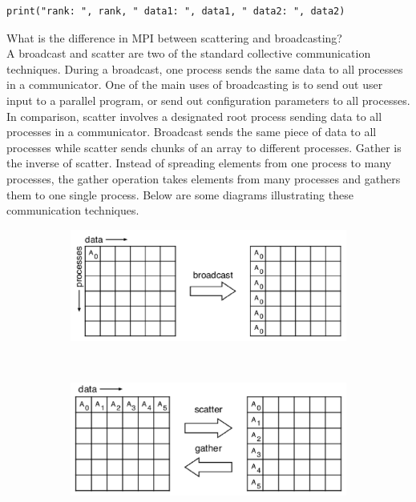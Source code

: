\documentclass[11pt]{article}
\begin{document}
\begin{enumerate}
\begin{verbatim}
print("rank: ", rank, " data1: ", data1, " data2: ", data2) 
    \end{verbatim}
    What is the difference in MPI between scattering and broadcasting? \\
    A broadcast and scatter are two of the standard collective communication techniques. During a broadcast, one process sends the same data to all processes in a communicator. One of the main uses of broadcasting is to send out user input to a parallel program, or send out configuration parameters to all processes. In comparison, scatter involves a designated root process sending data to all processes in a communicator. Broadcast sends the same piece of data to all processes while scatter sends chunks of an array to different processes. Gather is the inverse of scatter. Instead of spreading elements from one process to many processes, the gather operation takes elements from many processes and gathers them to one single process. Below are some diagrams illustrating these communication techniques.
        \begin{figure}[H]
     \centering
     \begin{subfigure}[b]{0.8\textwidth}
         \centering
         \includegraphics[width=\textwidth]{../figures/broadcast}
     \end{subfigure}
     \\
     \begin{subfigure}[b]{0.8\textwidth}
         \centering
         \includegraphics[width=\textwidth]{../figures/scatter}

\end{subfigure}
\end{figure}
\end{enumerate}
\end{document}
